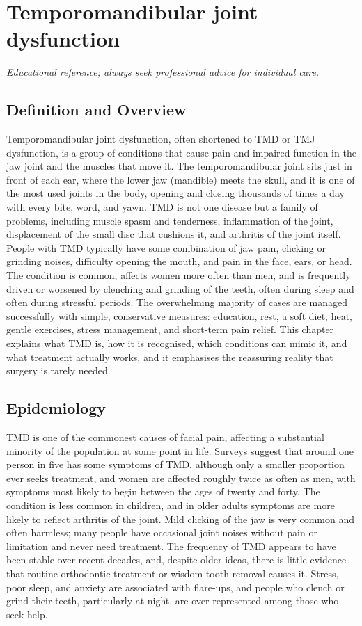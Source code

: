 \chapter{Temporomandibular joint dysfunction}

\medskip
\noindent\textit{Educational reference; always seek professional advice for individual care.}

\section*{Definition and Overview}
Temporomandibular joint dysfunction, often shortened to TMD or TMJ dysfunction, is a group of conditions that cause pain and impaired function in the jaw joint and the muscles that move it. The temporomandibular joint sits just in front of each ear, where the lower jaw (mandible) meets the skull, and it is one of the most used joints in the body, opening and closing thousands of times a day with every bite, word, and yawn. TMD is not one disease but a family of problems, including muscle spasm and tenderness, inflammation of the joint, displacement of the small disc that cushions it, and arthritis of the joint itself. People with TMD typically have some combination of jaw pain, clicking or grinding noises, difficulty opening the mouth, and pain in the face, ears, or head. The condition is common, affects women more often than men, and is frequently driven or worsened by clenching and grinding of the teeth, often during sleep and often during stressful periods. The overwhelming majority of cases are managed successfully with simple, conservative measures: education, rest, a soft diet, heat, gentle exercises, stress management, and short-term pain relief. This chapter explains what TMD is, how it is recognised, which conditions can mimic it, and what treatment actually works, and it emphasises the reassuring reality that surgery is rarely needed.

\section*{Epidemiology}
TMD is one of the commonest causes of facial pain, affecting a substantial minority of the population at some point in life. Surveys suggest that around one person in five has some symptoms of TMD, although only a smaller proportion ever seeks treatment, and women are affected roughly twice as often as men, with symptoms most likely to begin between the ages of twenty and forty. The condition is less common in children, and in older adults symptoms are more likely to reflect arthritis of the joint. Mild clicking of the jaw is very common and often harmless; many people have occasional joint noises without pain or limitation and never need treatment. The frequency of TMD appears to have been stable over recent decades, and, despite older ideas, there is little evidence that routine orthodontic treatment or wisdom tooth removal causes it. Stress, poor sleep, and anxiety are associated with flare-ups, and people who clench or grind their teeth, particularly at night, are over-represented among those who seek help.

